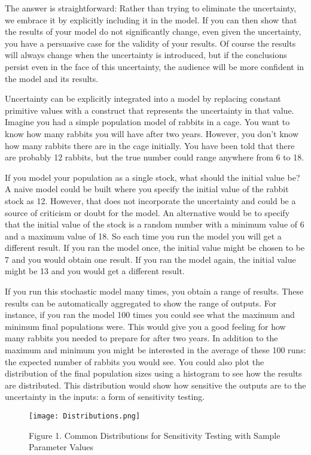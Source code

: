 \documentclass[]{memoir}
\let\Oldincludegraphics\includegraphics
\renewcommand{\includegraphics}[1]{\Oldincludegraphics[max size={\textwidth}{\textheight}]{#1}}
\begin{document}
The answer is straightforward: Rather than trying to eliminate the
uncertainty, we embrace it by explicitly including it in the model. If
you can then show that the results of your model do not significantly
change, even given the uncertainty, you have a persuasive case for the
validity of your results. Of course the results will always change when
the uncertainty is introduced, but if the conclusions persist even in
the face of this uncertainty, the audience will be more confident in the
model and its results.

Uncertainty can be explicitly integrated into a model by replacing
constant primitive values with a construct that represents the
uncertainty in that value. Imagine you had a simple population model of
rabbits in a cage. You want to know how many rabbits you will have after
two years. However, you don't know how many rabbits there are in the
cage initially. You have been told that there are probably 12 rabbits,
but the true number could range anywhere from 6 to 18.

If you model your population as a single stock, what should the initial
value be? A naive model could be built where you specify the initial
value of the rabbit stock as 12. However, that does not incorporate the
uncertainty and could be a source of criticism or doubt for the model.
An alternative would be to specify that the initial value of the stock
is a random number with a minimum value of 6 and a maximum value of 18.
So each time you run the model you will get a different result. If you
ran the model once, the initial value might be chosen to be 7 and you
would obtain one result. If you ran the model again, the initial value
might be 13 and you would get a different result.

If you run this stochastic model many times, you obtain a range of
results. These results can be automatically aggregated to show the range
of outputs. For instance, if you ran the model 100 times you could see
what the maximum and minimum final populations were. This would give you
a good feeling for how many rabbits you needed to prepare for after two
years. In addition to the maximum and minimum you might be interested in
the average of these 100 runs: the expected number of rabbits you would
see. You could also plot the distribution of the final population sizes
using a histogram to see how the results are distributed. This
distribution would show how sensitive the outputs are to the uncertainty
in the inputs: a form of sensitivity testing.

\begin{figure}[htbp]
\centering
\texttt{[image: Distributions.png]}
\caption{Figure 1. Common Distributions for Sensitivity Testing with
Sample Parameter Values}
\end{figure}
\end{document}
